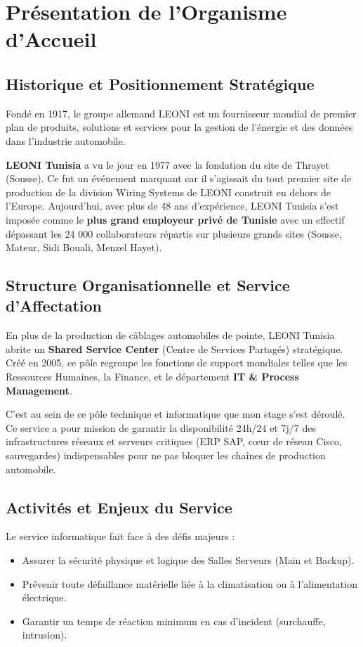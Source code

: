 \documentclass[12pt,a4paper]{report}
\begin{document}
\chapter{Présentation de l'Organisme d'Accueil}

\section{Historique et Positionnement Stratégique}
Fondé en 1917, le groupe allemand LEONI est un fournisseur mondial de premier plan de produits, solutions et services pour la gestion de l'énergie et des données dans l'industrie automobile. 

\textbf{LEONI Tunisia} a vu le jour en 1977 avec la fondation du site de Thrayet (Sousse). Ce fut un événement marquant car il s'agissait du tout premier site de production de la division Wiring Systems de LEONI construit en dehors de l'Europe. Aujourd'hui, avec plus de 48 ans d'expérience, LEONI Tunisia s'est imposée comme le \textbf{plus grand employeur privé de Tunisie} avec un effectif dépassant les 24 000 collaborateurs répartis sur plusieurs grands sites (Sousse, Mateur, Sidi Bouali, Menzel Hayet). 

\section{Structure Organisationnelle et Service d'Affectation}
En plus de la production de câblages automobiles de pointe, LEONI Tunisia abrite un \textbf{Shared Service Center} (Centre de Services Partagés) stratégique. Créé en 2005, ce pôle regroupe les fonctions de support mondiales telles que les Ressources Humaines, la Finance, et le département \textbf{IT \& Process Management}. 

C'est au sein de ce pôle technique et informatique que mon stage s'est déroulé. Ce service a pour mission de garantir la disponibilité 24h/24 et 7j/7 des infrastructures réseaux et serveurs critiques (ERP SAP, cœur de réseau Cisco, sauvegardes) indispensables pour ne pas bloquer les chaînes de production automobile.

\section{Activités et Enjeux du Service}
Le service informatique fait face à des défis majeurs :
\begin{itemize}
    \item Assurer la sécurité physique et logique des Salles Serveurs (Main et Backup).
    \item Prévenir toute défaillance matérielle liée à la climatisation ou à l'alimentation électrique.
    \item Garantir un temps de réaction minimum en cas d'incident (surchauffe, intrusion).
\end{itemize}
\end{document}
